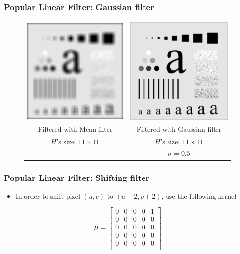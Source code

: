 \documentclass[english,11pt,table,handout]{beamer}
\begin{document}
{
	\frametitle{Popular Linear Filter: Gaussian filter}
	\begin{figure}
		\begin{tabular}{cc}
			\includegraphics[scale=0.53]{char_mean_11_11.png} &
			\includegraphics[scale=0.53]{char_gaussian_11_11_05.png} \\
			Filtered with Mean filter  & Filtered with Gaussian filter \\
			$H$'s size: $11 \times 11$ & $H$'s size: $11 \times 11$ \\
									& 	$\sigma =0.5$
		\end{tabular}
	\end{figure}
}

\frame
{
	\frametitle{Popular Linear Filter: Shifting filter}
	\begin{example}
		\begin{itemize}
			\item In order to shift pixel $(u,v)$ to $(u-2, v+2)$, use the following kernel
		\end{itemize}
		$$
		H = 
		\begin{bmatrix}
		0 & 0 & 0 & 0 & 1\\
		0 & 0 & 0 & 0 & 0\\
		0 & 0 & 0 & 0 & 0\\
		0 & 0 & 0 & 0 & 0\\
		0 & 0 & 0 & 0 & 0\\
		\end{bmatrix}
		$$
		
	\end{example}
}
\end{document}
